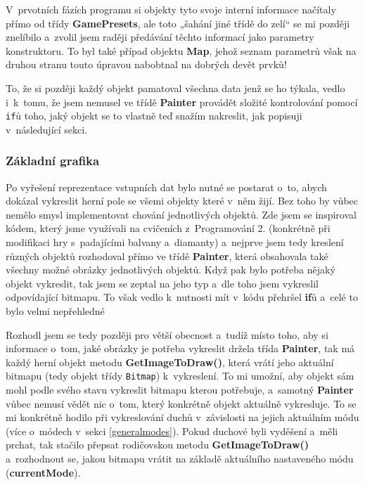 \documentclass[a4]{article}
\begin{document}
V~prvotních fázích programu si objekty tyto svoje interní informace načítaly přímo od třídy \textbf{GamePresets}, ale toto „šahání jiné třídě do zelí“ se mi později znelíbilo a~zvolil jsem raději předávání těchto informací jako parametry konstruktoru. To byl také případ objektu \textbf{Map}, jehož seznam parametrů však na druhou stranu touto úpravou nabobtnal na dobrých devět prvků!

To, že si později každý objekt pamatoval všechna data jenž se ho týkala, vedlo i~k~tomu, že jsem nemusel ve třídě \textbf{Painter} provádět složité kontrolování pomocí \verb|if|ů toho, jaký objekt se to vlastně teď snažím nakreslit, jak popisuji v~následující sekci.

\subsubsection{Základní grafika} \label{staticgraphics}
Po vyřešení reprezentace vstupních dat bylo nutné se postarat o~to, abych dokázal vykreslit herní pole se všemi objekty které v~něm žijí. Bez toho by vůbec nemělo smysl implementovat chování jednotlivých objektů. Zde jsem se inspiroval kódem, který jsme využívali na cvičeních z~Programování 2. (konkrétně při modifikaci hry s~padajícími balvany a~diamanty) a~nejprve jsem tedy kreslení různých objektů rozhodoval přímo ve třídě \textbf{Painter}, která obsahovala také všechny možné obrázky jednotlivých objektů. Když pak bylo potřeba nějaký objekt vykreslit, tak jsem se zeptal na jeho typ a~dle toho jsem vykreslil odpovídající bitmapu. To však vedlo k~nutnosti mít v~kódu přehršel \textbf{if}ů a~celé to bylo velmi nepřehledné

Rozhodl jsem se tedy později pro větší obecnost a~tudíž místo toho, aby si informace o~tom, jaké obrázky je potřeba vykreslit držela třída \textbf{Painter}, tak má každý herní objekt metodu \textbf{GetImageToDraw()}, která vrátí jeho aktuální bitmapu (tedy objekt třídy \verb|Bitmap|) k~vykreslení. To mi umožní, aby objekt sám mohl podle svého stavu vykreslit bitmapu kterou potřebuje, a~samotný \textbf{Painter} vůbec nemusí vědět nic o~tom, který konkrétně objekt aktuálně vykresluje. To se mi konkrétně hodilo při vykreslování duchů v~závislosti na jejich aktuálním módu (více o~módech v~sekci \ref{generalmodes}). Pokud duchové byli vyděšení a~měli prchat, tak stačilo přepsat rodičovskou metodu \textbf{GetImageToDraw()} a~rozhodnout se, jakou bitmapu vrátit na základě aktuálního nastaveného módu (\textbf{currentMode}).
\end{document}

